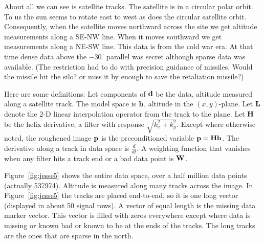 About all we can see is satellite tracks.
The satellite is in a circular polar orbit.
To us the sun seems to rotate east to west
as does the circular satellite orbit.
Consequently, when the satellite moves northward across the site
we get altitude measurements along a SE-NW line.
When it moves southward we get measurements along a NE-SW line.
This data is from the cold war era.
At that time dense data above the $-30^\circ$ parallel was secret
although sparse data was available.
(The restriction had to do with precision guidance of missiles.
Would the missile hit the silo?
or miss it by enough to save the retaliation missile?)

\par
Here are some definitions:
Let components of $\bold d$ be the data,
altitude measured along a satellite track.
The model space is $\bold h$, altitude in the $(x,y)$-plane.
Let $\bold L$ denote the 2-D linear interpolation operator
from the track to the plane.
Let $\bold H$ be the helix derivative,
a filter with response $\sqrt{k_x^2+k_y^2}$.
Except where otherwise noted,
the roughened image $\bold p$ is the preconditioned variable
$\bold p =\bold H \bold h$.
The derivative along a track in data space is $\frac{d}{ dt}$.
A weighting function that vanishes when any filter hits a track end
or a bad data point is $\bold W$.

\par
Figure~\ref{fig:jesse5} shows the entire data space,
over a half million data points (actually 537974).
Altitude is measured along many tracks across the image.
In Figure~\ref{fig:jesse5} the tracks are placed end-to-end,
so it is one long vector (displayed in about 50 signal rows).
A vector of equal length is the missing data marker vector.
This vector is filled with zeros everywhere except where
data is missing or known bad or known to be at the ends of the tracks.
The long tracks are the ones that are sparse in the north.


